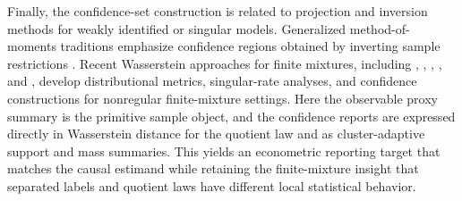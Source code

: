 Finally, the confidence-set construction is related to projection and inversion methods for weakly identified or singular models. Generalized method-of-moments traditions emphasize confidence regions obtained by inverting sample restrictions \citep{Hansen1982}. Recent Wasserstein approaches for finite mixtures, including \citet{WuYang2020}, \citet{DossWuYangZhou2023}, \citet{DeoRandrianarisoa2023}, \citet{BingBuneaNilesWeed2025}, and \citet{NilesWeedRigollet2022}, develop distributional metrics, singular-rate analyses, and confidence constructions for nonregular finite-mixture settings. Here the observable proxy summary is the primitive sample object, and the confidence reports are expressed directly in Wasserstein distance for the quotient law and as cluster-adaptive support and mass summaries. This yields an econometric reporting target that matches the causal estimand while retaining the finite-mixture insight that separated labels and quotient laws have different local statistical behavior.
